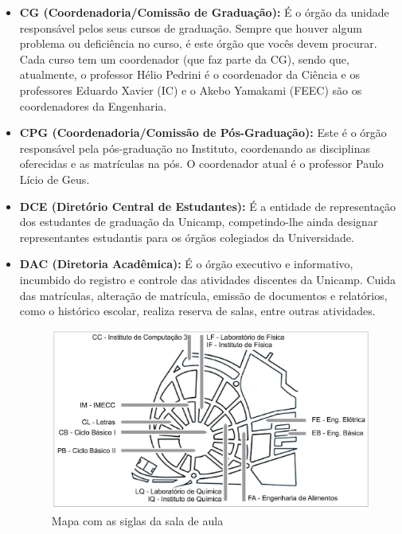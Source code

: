 \begin{itemize}
    \item  \textbf{CG (Coordenadoria/Comissão de Graduação):} É o órgão da
    unidade responsável pelos seus cursos de graduação. Sempre que houver algum
    problema ou deficiência no curso, é este órgão que vocês devem procurar.
    Cada curso tem um coordenador (que faz parte da CG), sendo que, atualmente,
    o professor Hélio Pedrini é o coordenador da Ciência e os professores
    Eduardo Xavier (IC) e o Akebo Yamakami (FEEC) são os coordenadores da
    Engenharia.

    \item  \textbf{CPG (Coordenadoria/Comissão de Pós-Graduação):} Este
    é o órgão responsável pela pós-graduação no Instituto, coordenando as
    disciplinas oferecidas e as matrículas na pós. O coordenador atual
    é o professor Paulo Lício de Geus.

    \item  \textbf{DCE (Diretório Central de Estudantes):} É a entidade de
    representação dos estudantes de graduação da Unicamp, competindo-lhe ainda
    designar representantes estudantis para os órgãos colegiados da
    Universidade.

    \item  \textbf{DAC (Diretoria Acadêmica):} É o órgão executivo
    e informativo, incumbido do registro e controle das atividades discentes da
    Unicamp. Cuida das matrículas, alteração de matrícula, emissão de documentos
    e relatórios, como o histórico escolar, realiza reserva de salas, entre
    outras atividades.

    \begin{figure}[hb!]
        \includegraphics[scale=0.26, keepaspectratio=true]{img/imgs/10-siglas_malucas/mapa_siglas.jpg}
        \caption{Mapa com as siglas da sala de aula}
        \label{fig:mapa_siglas}
    \end{figure}


\end{itemize}
